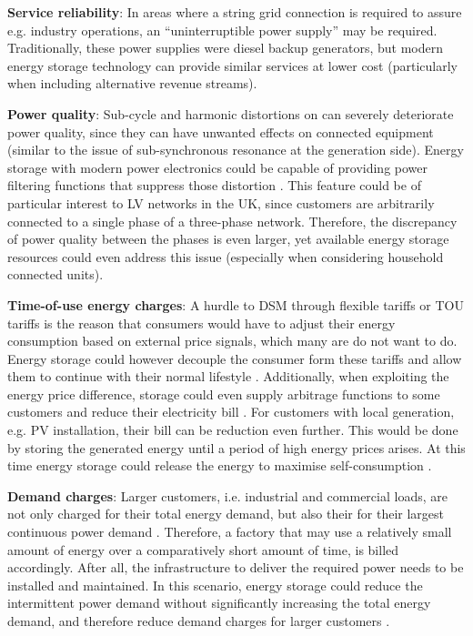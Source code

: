 \textbf{Service reliability}: In areas where a string grid connection is required to assure e.g. industry operations, an ``uninterruptible power supply'' may be required.
Traditionally, these power supplies were diesel backup generators, but modern energy storage technology can provide similar services at lower cost \cite{Schoenung2001} (particularly when including alternative revenue streams).

\textbf{Power quality}: Sub-cycle and harmonic distortions on can severely deteriorate power quality, since they can have unwanted effects on connected equipment (similar to the issue of sub-synchronous resonance at the generation side).
Energy storage with modern power electronics could be capable of providing power filtering functions that suppress those distortion \cite{Putrus2007}.
This feature could be of particular interest to LV networks in the UK, since customers are arbitrarily connected to a single phase of a three-phase network.
Therefore, the discrepancy of power quality between the phases is even larger, yet available energy storage resources could even address this issue \cite{Miret2009} (especially when considering household connected units).


\textbf{Time-of-use energy charges}: A hurdle to DSM through flexible tariffs or TOU tariffs is the reason that consumers would have to adjust their energy consumption based on external price signals, which many are do not want to do.
Energy storage could however decouple the consumer form these tariffs and allow them to continue with their normal lifestyle \cite{Khani2014}.
Additionally, when exploiting the energy price difference, storage could even supply arbitrage functions to some customers and reduce their electricity bill \cite{Nair2010a}.
For customers with local generation, e.g. PV installation, their bill can be reduction even further.
This would be done by storing the generated energy until a period of high energy prices arises.
At this time energy storage could release the energy to maximise self-consumption \cite{Luthander2016}.

\textbf{Demand charges}: Larger customers, i.e. industrial and commercial loads, are not only charged for their total energy demand, but also their for their largest continuous power demand \cite{Oudalov2007, Mackey2013}.
Therefore, a factory that may use a relatively small amount of energy over a comparatively short amount of time, is billed accordingly.
After all, the infrastructure to deliver the required power needs to be installed and maintained.
In this scenario, energy storage could reduce the intermittent power demand without significantly increasing the total energy demand, and therefore reduce demand charges for larger customers \cite{Aghaei2013}.

